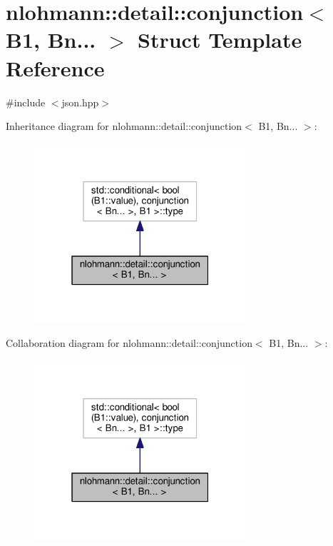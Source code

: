 \hypertarget{structnlohmann_1_1detail_1_1conjunction_3_01_b1_00_01_bn_8_8_8_01_4}{}\section{nlohmann\+:\+:detail\+:\+:conjunction$<$ B1, Bn... $>$ Struct Template Reference}
\label{structnlohmann_1_1detail_1_1conjunction_3_01_b1_00_01_bn_8_8_8_01_4}


{\ttfamily \#include $<$json.\+hpp$>$}



Inheritance diagram for nlohmann\+:\+:detail\+:\+:conjunction$<$ B1, Bn... $>$\+:\nopagebreak
\begin{figure}[H]
\begin{center}
\leavevmode
\includegraphics[width=223pt]{structnlohmann_1_1detail_1_1conjunction_3_01_b1_00_01_bn_8_8_8_01_4__inherit__graph}
\end{center}
\end{figure}


Collaboration diagram for nlohmann\+:\+:detail\+:\+:conjunction$<$ B1, Bn... $>$\+:\nopagebreak
\begin{figure}[H]
\begin{center}
\leavevmode
\includegraphics[width=223pt]{structnlohmann_1_1detail_1_1conjunction_3_01_b1_00_01_bn_8_8_8_01_4__coll__graph}
\end{center}
\end{figure}


